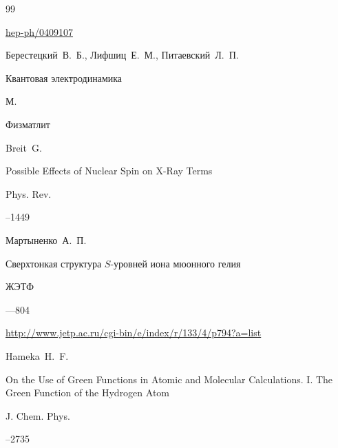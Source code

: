 \begin{thebibliography}{99}



\arxiv \href{http://arxiv.org/abs/hep-ph/0409107}{hep-ph/0409107}




\by Берестецкий~В.~Б., Лифшиц~Е.~М., Питаевский~Л.~П.

\book Квантовая электродинамика

\publaddr М.

\publ Физматлит






\by Breit~G.

\paper Possible Effects of Nuclear Spin on X-Ray Terms

\jour Phys. Rev.




--1449





\by Мартыненко~А.~П.

\paper Сверхтонкая структура $S$-уровней иона мюонного гелия

\jour ЖЭТФ




---804

\elink \url{http://www.jetp.ac.ru/cgi-bin/e/index/r/133/4/p794?a=list}




\by Hameka~H.~F.

\paper On the Use of Green Functions in Atomic and Molecular Calculations. I. The Green Function of the Hydrogen Atom

\jour J. Chem. Phys.




--2735





\end{thebibliography}
